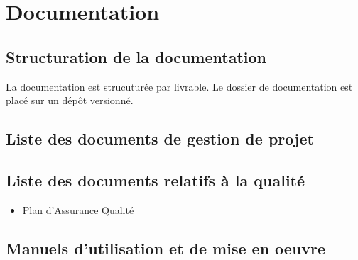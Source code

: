 \section{Documentation}

\subsection{Structuration de la documentation}
La documentation est strucuturée par livrable. Le dossier de documentation est placé sur un dépôt versionné.

\subsection{Liste des documents de gestion de projet}


\subsection{Liste des documents relatifs à la qualité}

\begin{itemize}
    \item Plan d'Assurance Qualité
\end{itemize}

\subsection{Manuels d'utilisation et de mise en oeuvre}
\pagebreak
